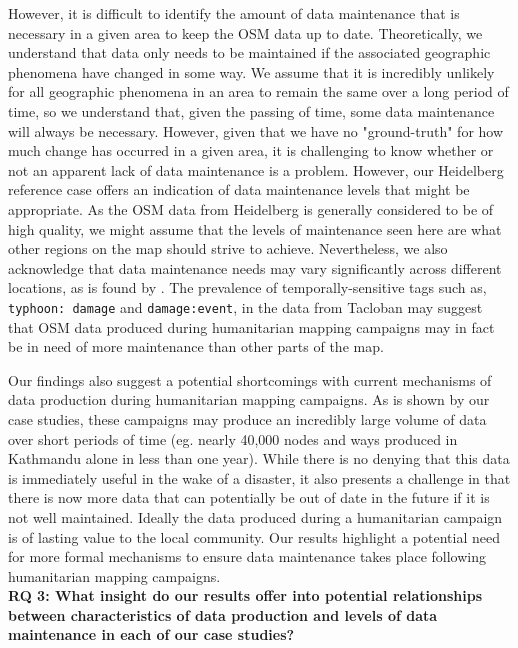 However, it is difficult to identify the amount of data maintenance that is necessary in a given area to keep the OSM data up to date. Theoretically, we understand that data only needs to be maintained if the associated geographic phenomena have changed in some way. We assume that it is incredibly unlikely for all geographic phenomena in an area to remain the same over a long period of time, so we understand that, given the passing of time, some data maintenance will always be necessary. However, given that we have no "ground-truth" for how much change has occurred in a given area, it is challenging to know whether or not an apparent lack of data maintenance is a problem. However, our Heidelberg reference case offers an indication of data maintenance levels that might be appropriate. As the OSM data from Heidelberg is generally considered to be of high quality, we might assume that the levels of maintenance seen here are what other regions on the map should strive to achieve. Nevertheless, we also acknowledge that data maintenance needs may vary significantly across different locations, as is found by \textcite{quattrone_work_2017}. The prevalence of temporally-sensitive tags such as, \texttt{typhoon: damage} and \texttt{damage:event}, in the data from Tacloban may suggest that OSM data produced during humanitarian mapping campaigns may in fact be in need of more maintenance than other parts of the map.

Our findings also suggest a potential shortcomings with current mechanisms of data production during humanitarian mapping campaigns. As is shown by our case studies, these campaigns may produce an incredibly large volume of data over short periods of time (eg. nearly 40,000 nodes and ways produced in Kathmandu alone in less than one year). While there is no denying that this data is immediately useful in the wake of a disaster, it also presents a challenge in that there is now more data that can potentially be out of date in the future if it is not well maintained. Ideally the data produced during a humanitarian campaign is of lasting value to the local community. Our results highlight a potential need for more formal mechanisms to ensure data maintenance takes place following humanitarian mapping campaigns.\\

\noindent\textbf{RQ 3: What insight do our results offer into potential relationships between characteristics of data production and levels of data maintenance in each of our case studies?}

